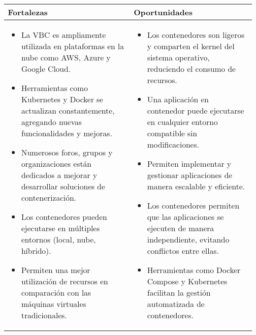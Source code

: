 \begin{table}[H]
\centering
\scriptsize
\setlength{\tabcolsep}{4pt}
\renewcommand{\arraystretch}{1.2}
\begin{tabularx}{\textwidth}{|X|X|}
\hline
\textbf{Fortalezas} & \textbf{Oportunidades} \\
\hline
\begin{minipage}[t]{\linewidth}
\vspace{2pt}
\begin{itemize}
    \setlength\itemsep{0pt}
    \setlength\parskip{0pt}
    \setlength\parsep{0pt}
    \item La VBC es ampliamente utilizada en plataformas en la nube como AWS, Azure y Google Cloud.
    \item Herramientas como Kubernetes y Docker se actualizan constantemente, agregando nuevas funcionalidades y mejoras.
    \item Numerosos foros, grupos y organizaciones están dedicados a mejorar y desarrollar soluciones de contenerización.
    \item Los contenedores pueden ejecutarse en múltiples entornos (local, nube, híbrido).
    \item Permiten una mejor utilización de recursos en comparación con las máquinas virtuales tradicionales.
\end{itemize}
\vspace{2pt}
\end{minipage}
&
\begin{minipage}[t]{\linewidth}
\vspace{2pt}
\begin{itemize}
    \setlength\itemsep{0pt}
    \setlength\parskip{0pt}
    \setlength\parsep{0pt}
    \item Los contenedores son ligeros y comparten el kernel del sistema operativo, reduciendo el consumo de recursos.
    \item Una aplicación en contenedor puede ejecutarse en cualquier entorno compatible sin modificaciones.
    \item Permiten implementar y gestionar aplicaciones de manera escalable y eficiente.
    \item Los contenedores permiten que las aplicaciones se ejecuten de manera independiente, evitando conflictos entre ellas.
    \item Herramientas como Docker Compose y Kubernetes facilitan la gestión automatizada de contenedores.
\end{itemize}
\vspace{2pt}

\end{minipage}
\end{tabularx}
\end{table}
